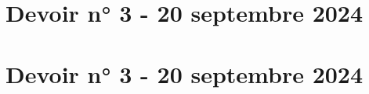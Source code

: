 \section*{Devoir n° 3 - 20 septembre 2024}



\newpage

\setcounter{exrcntr}{0}

\section*{Devoir n° 3 - 20 septembre 2024}




\setcounter{exrcntr}{0}



